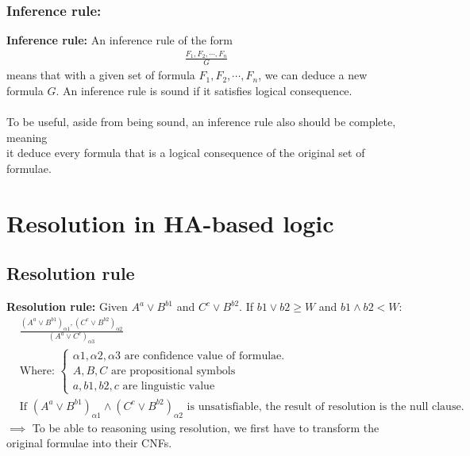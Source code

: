 \documentclass[26pt,fleqn,]{article}
\begin{document}
\subsubsection{Inference rule:}
{\bfseries Inference rule:} An inference rule of the form\\
\begin{align*}
	\frac{F_1, F_2,\cdots,F_n}{G}
\end{align*}
means that with a given set of formula \(F_1,F_2,\cdots,F_n\), we can deduce a 
new formula \(G\). An inference rule is sound if it satisfies logical consequence.\\\\
To be useful, aside from being sound, an inference rule also should be complete, meaning\\
it deduce every formula that is a logical consequence of the original set of formulae.\\

%
%
\section{Resolution in HA-based logic}
\subsection{Resolution rule}
{\bfseries Resolution rule:} Given \(A^a \vee B^{b1}\) and \(C^c \vee B^{b2}\). If \(b1 \vee b2 
\ge W\) and \(b1 \wedge b2 < W\):
\begin{align*}
	&\frac{(A^a \vee B^{b1})_{\alpha 1}, (C^c \vee B^{b2})_{\alpha 2}} {(A^a \vee C^c)_{\alpha 3}}\\
	&\text{Where: }
	\begin{cases}
	\alpha 1, \alpha 2, \alpha 3 \text{ are confidence value of formulae.}\\
	A, B, C \text{ are propositional symbols}\\
	a, b1, b2, c \text{ are linguistic value}
	\end{cases}
	\\
	&\text{If } (A^a \vee B^{b1})_{\alpha 1} \wedge (C^c \vee B^{b2})_{\alpha 2} \text{ is 
	unsatisfiable, the result of resolution is the null clause.} 
\end{align*}
\(\implies\) To be able to reasoning using resolution, we first have to transform the original
formulae into their CNFs.\\
\end{document}
